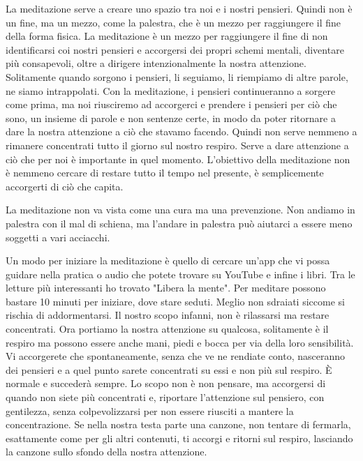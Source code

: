 \documentclass[12pt]{book} %
\begin{document}
La meditazione serve a creare uno spazio tra noi e i nostri pensieri. 
Quindi non è un fine, ma un mezzo, come la palestra, che è un mezzo per raggiungere il fine della forma fisica. La meditazione
è un mezzo per raggiungere il fine di non identificarsi coi nostri pensieri e accorgersi dei propri schemi mentali,
diventare più consapevoli, oltre a dirigere intenzionalmente la nostra attenzione. Solitamente quando sorgono i
pensieri, li seguiamo, li riempiamo di altre parole, ne siamo intrappolati. Con la
meditazione, i pensieri continueranno a sorgere come prima, ma noi riusciremo ad accorgerci e prendere i pensieri per
ciò che sono, un insieme di parole e non sentenze certe, in modo da poter ritornare a dare la nostra attenzione a ciò che
stavamo facendo. Quindi non serve nemmeno a rimanere concentrati tutto il giorno sul nostro respiro. 
Serve a dare attenzione a ciò che per noi è importante in quel momento. L'obiettivo della meditazione non è
nemmeno cercare di restare tutto il tempo nel presente, è semplicemente accorgerti di ciò che capita.

La meditazione non va vista come una cura ma una prevenzione. Non andiamo in palestra con il mal di schiena, ma l'andare in palestra può aiutarci a essere meno soggetti a vari acciacchi.

Un modo per iniziare la meditazione è quello di cercare un'app che vi possa guidare nella pratica o audio che potete trovare su YouTube e infine i libri. Tra le letture più interessanti ho trovato "Libera la mente". 
Per meditare possono bastare 10 minuti per iniziare, dove stare seduti. Meglio non sdraiati siccome si rischia di addormentarsi.
Il nostro scopo infanni, non è rilassarsi ma restare concentrati. Ora portiamo la nostra attenzione su qualcosa, solitamente è il respiro ma possono essere anche mani, piedi e bocca per via della loro sensibilità. 
Vi accorgerete che spontaneamente, senza che ve ne rendiate conto, nasceranno dei pensieri e a quel punto
sarete concentrati su essi e non più sul respiro. È normale e succederà sempre. Lo
scopo non è non pensare, ma accorgersi di quando non siete più concentrati e, riportare l'attenzione sul pensiero, con gentilezza, senza colpevolizzarsi per non essere riusciti a mantere la concentrazione. Se nella nostra testa parte una canzone, non tentare di fermarla, esattamente come per gli altri contenuti, ti accorgi e ritorni sul respiro, lasciando la canzone sullo sfondo della nostra attenzione.
\end{document}
